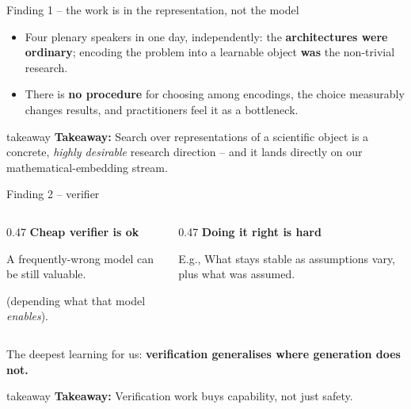 \documentclass[aspectratio=169,11pt]{beamer}
\newcommand{\takeaway}[1]{%
  \vfill
  \begin{beamercolorbox}[wd=\textwidth,sep=0.45em]{takeaway}
    \small\textbf{Takeaway:} #1
  \end{beamercolorbox}%
}
\newcommand{\lead}[1]{\textcolor{fpaccent}{\textbf{#1}}}
\begin{document}
\begin{frame}{Finding 1 -- the work is in the representation, not the model}
  \begin{itemize}\setlength\itemsep{0.6em}
    \item Four plenary speakers in one day, independently: the \textbf{architectures were ordinary}; encoding the problem into a learnable object \textbf{was} the non-trivial research.
    \item There is \textbf{no procedure} for choosing among encodings, the choice measurably changes results, and practitioners feel it as a bottleneck.
  \end{itemize}
  \takeaway{Search over representations of a scientific object is a concrete, \emph{highly desirable} research direction -- and it lands directly on our mathematical-embedding stream.}
\end{frame}

\begin{frame}{Finding 2 -- verifier}
  \begin{columns}[T,onlytextwidth]
    \begin{column}{0.47\textwidth}
      \lead{Cheap verifier is ok}\par\vspace{0.3em}
      \small
      A frequently-wrong model can be still valuable.\par\vspace{0.3em}
      (depending what that model \emph{enables}).
    \end{column}
    \begin{column}{0.47\textwidth}
      \lead{Doing it right is hard}\par\vspace{0.3em}
      \small
       E.g., What stays stable as assumptions vary, plus what was assumed.
    \end{column}
  \end{columns}
  \vspace{1.9em}
  The deepest learning for us: \textbf{verification generalises where generation does not.}
  \takeaway{Verification work buys capability, not just safety.}
\end{frame}
\end{document}
